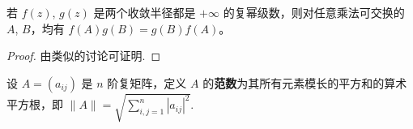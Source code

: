 \documentclass[../../main.tex]{subfiles}%
\begin{document}
\begin{corollary}\label{corollary:矩阵幂级数乘法可交换}
若 $f(z)$, $g(z)$ 是两个收敛半径都是 $+\infty$ 的复幂级数，则对任意乘法可交换的 $A$, $B$，均有 $f(A)g(B)=g(B)f(A)$。 
\end{corollary}
\begin{proof}

由类似的讨论可证明.

\end{proof}

\begin{definition}[矩阵的范数]\label{definition:矩阵的范数}
设 $A=(a_{ij})$ 是 $n$ 阶复矩阵，定义 $A$ 的\textbf{范数}为其所有元素模长的平方和的算术平方根，即 $\|A\| = \sqrt{\sum_{i,j = 1}^{n}|a_{ij}|^2}$.
\end{definition}
\end{document}
